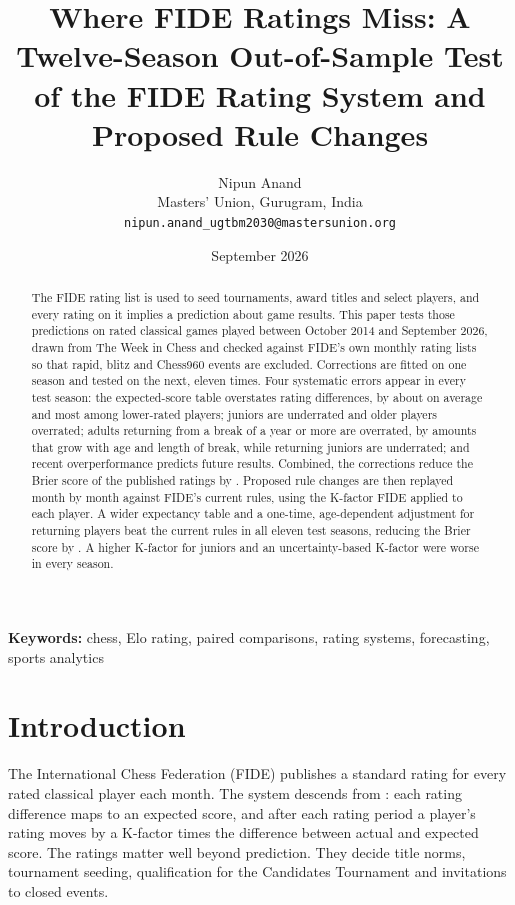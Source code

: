 \documentclass[11pt]{article}
\title{Where FIDE Ratings Miss: A Twelve-Season Out-of-Sample Test of the FIDE Rating System and Proposed Rule Changes}
\author{Nipun Anand\\ Masters' Union, Gurugram, India\\ \texttt{nipun.anand\_ugtbm2030@mastersunion.org}}
\date{September 2026}
\begin{document}
\maketitle

\begin{abstract}
The FIDE rating list is used to seed tournaments, award titles and select players, and every rating on it implies a prediction about game results. This paper tests those predictions on \NGames{} rated classical games played between October 2014 and September 2026, drawn from The Week in Chess and checked against FIDE's own monthly rating lists so that rapid, blitz and Chess960 events are excluded. Corrections are fitted on one season and tested on the next, eleven times. Four systematic errors appear in every test season: the expected-score table overstates rating differences, by about \GapWidePct{} on average and most among lower-rated players; juniors are underrated and older players overrated; adults returning from a break of a year or more are overrated, by amounts that grow with age and length of break, while returning juniors are underrated; and recent overperformance predicts future results. Combined, the corrections reduce the Brier score of the published ratings by \WFGain{}. Proposed rule changes are then replayed month by month against FIDE's current rules, using the K-factor FIDE applied to each player. A wider expectancy table and a one-time, age-dependent adjustment for returning players beat the current rules in all eleven test seasons, reducing the Brier score by \SimGain{}. A higher K-factor for juniors and an uncertainty-based K-factor were worse in every season.
\end{abstract}

\noindent\textbf{Keywords:} chess, Elo rating, paired comparisons, rating systems, forecasting, sports analytics

\section{Introduction}

The International Chess Federation (FIDE) publishes a standard rating for every rated classical player each month. The system descends from \citet{elo1978}: each rating difference maps to an expected score, and after each rating period a player's rating moves by a K-factor times the difference between actual and expected score. The ratings matter well beyond prediction. They decide title norms, tournament seeding, qualification for the Candidates Tournament and invitations to closed events.
\end{document}
